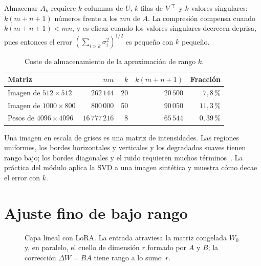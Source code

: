Almacenar $A_k$ requiere $k$ columnas de $U$, $k$ filas de $V^{\top}$ y $k$ valores singulares: $k(m+n+1)$ números frente a los $mn$ de $A$. La compresión compensa cuando $k(m+n+1)<mn$, y es eficaz cuando los valores singulares decrecen deprisa, pues entonces el error $(\sum_{i>k}\sigma_i^{2})^{1/2}$ es pequeño con $k$ pequeño.

\begin{table}[h]
\centering\small
\caption{Coste de almacenamiento de la aproximación de rango $k$.}\label{tab:compresion}
\begin{tabular}{@{}lrrrr@{}}
\toprule
Matriz & $mn$ & $k$ & $k(m+n+1)$ & Fracción \\
\midrule
Imagen de $512\times 512$ & $262\,144$ & 20 & $20\,500$ & $7{,}8\,\%$ \\
Imagen de $1000\times 800$ & $800\,000$ & 50 & $90\,050$ & $11{,}3\,\%$ \\
Pesos de $4096\times 4096$ & $16\,777\,216$ & 8 & $65\,544$ & $0{,}39\,\%$ \\
\bottomrule
\end{tabular}
\end{table}

Una imagen en escala de grises es una matriz de intensidades. Las regiones uniformes, los bordes horizontales y verticales y los degradados suaves tienen rango bajo; los bordes diagonales y el ruido requieren muchos términos~\cite[§7.2]{strang-ila}. La práctica del módulo aplica la SVD a una imagen sintética y muestra cómo decae el error con $k$.

\section{Ajuste fino de bajo rango}

\begin{figure}[h]
\centering
{}
\caption{Capa lineal con LoRA. La entrada atraviesa la matriz congelada $W_0$ y, en paralelo, el cuello de dimensión $r$ formado por $A$ y $B$; la corrección $\Delta W=BA$ tiene rango a lo sumo~$r$.}
\label{fig:lora}
\end{figure}

